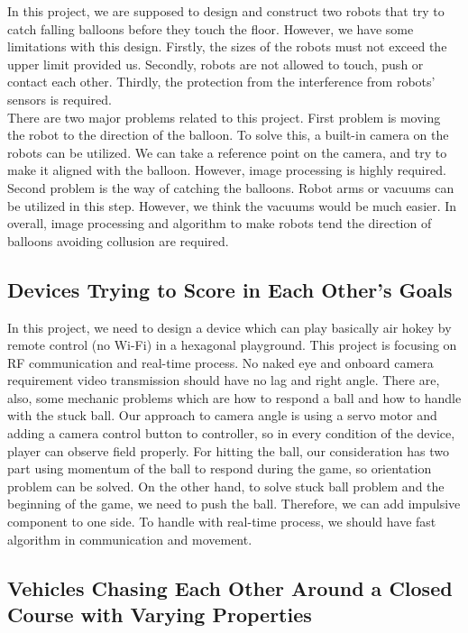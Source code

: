 \documentclass[a4paper,12pt]{article}
\begin{document}
In this project, we are supposed to design and construct two robots that try to catch falling balloons before they touch the floor. However, we have some limitations with this design. Firstly, the sizes of the robots must not exceed the upper limit provided us. Secondly, robots are not allowed to touch, push or contact each other. Thirdly, the protection from the interference from robots’ sensors is required.\\

There are two major problems related to this project. First problem is moving the robot to the direction of the balloon. To solve this, a built-in camera on the robots can be utilized. We can take a reference point on the camera, and try to make it aligned with the balloon. However, image processing is highly required. Second problem is the way of catching the balloons. Robot arms or vacuums can be utilized in this step. However, we think the vacuums would be much easier. In overall, image processing and algorithm to make robots tend the direction of balloons avoiding collusion are required.

\subsection{Devices Trying to Score in Each Other’s Goals}
In this project, we need to design a device which can play basically air hokey by remote control (no Wi-Fi) in a hexagonal playground. This project is focusing on RF communication and real-time process. No naked eye and onboard camera requirement video transmission should have no lag and right angle. There are, also, some mechanic problems which are how to respond a ball and how to handle with the stuck ball. Our approach to camera angle is using a servo motor and adding a camera control button to controller, so in every condition of the device, player can observe field properly. For hitting the ball, our consideration has two part using momentum of the ball to respond during the game, so orientation problem can be solved. On the other hand, to solve stuck ball problem and the beginning of the game, we need to push the ball. Therefore, we can add impulsive component to one side. To handle with real-time process, we should have fast algorithm in communication and movement. 

\subsection{Vehicles Chasing Each Other Around a Closed Course with Varying Properties}
\end{document}
